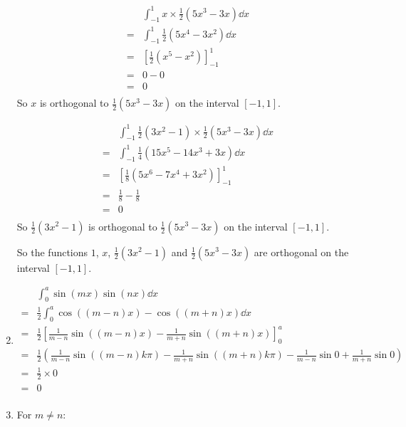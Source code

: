 \documentclass[10pt,\jkfside,a4paper]{article}
\begin{document}
\begin{enumerate}
\[
\begin{split}
 & \int^1_{-1} x \times \frac{1}{2}(5x^3 - 3x) \dd{x} \\
=& \int^1_{-1} \frac{1}{2}(5x^4 - 3x^2) \dd{x} \\
=& \left[\frac{1}{2}(x^5 - x^2)\right]^1_{-1} \\
=& 0 - 0 \\
=& 0 \\
\end{split}
\]
So $x$ is orthogonal to $\frac{1}{2}(5x^3 - 3x)$ on the interval $[-1, 1]$.

\[
\begin{split}
 & \int^1_{-1} \frac{1}{2}(3x^2 - 1) \times \frac{1}{2}(5x^3 - 3x) \dd{x} \\
=& \int^1_{-1} \frac{1}{4}(15x^5 - 14x^3 + 3x) \dd{x} \\
=& \left[ \frac{1}{8}(5x^6 - 7x^4 + 3x^2) \right]^1_{-1} \\
=& \frac{1}{8} - \frac{1}{8} \\
=& 0 \\
\end{split}
\]
So $\frac{1}{2}(3x^2 - 1)$ is orthogonal to $\frac{1}{2}(5x^3 - 3x)$ on the interval $[-1, 1]$.

So the functions $1$, $x$, $\frac{1}{2}(3x^2 - 1)$ and $\frac{1}{2}(5x^3 - 3x)$ are orthogonal 
on the interval $[-1, 1]$.

\item 

\[
\begin{split}
 & \int^a_0 \sin(mx)\sin(nx) \dd{x} \\
=& \frac{1}{2}\int^a_0 \cos((m - n)x) - \cos((m + n)x) \dd{x} \\
=& \frac{1}{2}\left[ \frac{1}{m - n}\sin((m - n)x) - \frac{1}{m + n}\sin((m + n)x) \right]^a_0 \\
=& \frac{1}{2}\left( \frac{1}{m - n}\sin((m - n)k\pi) - \frac{1}{m + n}\sin((m + n)k\pi) - \frac{1}{m - n}\sin 0 + \frac{1}{m + n}\sin 0 \right) \\
=& \frac{1}{2}\times 0 \\
=& 0 \\
\end{split}
\]

\item 

For $m \neq n$:


\end{enumerate}
\end{document}
